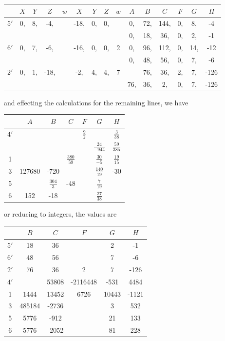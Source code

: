 \documentclass[11pt,a4paper]{article}
\begin{document}
\newpage
\setcounter{page}{326}

\begin{center}
\begin{tabular}{c|cccc|cccc|cccccc}
& $X$ & $Y$ & $Z$ & $w$ & $X$ & $Y$ & $Z$ & $w$ & $A$ & $B$ & $C$ & $F$ & $G$ & $H$\\\hline
$5'$ & 0, & 8, & -4, & & -18, & 0, & 0, & & 0, & 72, & 144, & 0, & 8, & -4\\
& & & & & & & & & 0, & 18, & 36, & 0, & 2, & -1\\
$6'$ & 0, & 7, & -6, & & -16, & 0, & 0, & 2 & 0, & 96, & 112, & 0, & 14, & -12\\
& & & & & & & & & 0, & 48, & 56, & 0, & 7, & -6\\
$2'$ & 0, & 1, & -18, & & -2, & 4, & 4, & 7 & & 76, & 36, & 2, & 7, & -126\\
& & & & & & & & & 76, & 36, & 2, & 0, & 7, & -126\\
\end{tabular}
\end{center}
and effecting the calculations for the remaining lines, we have
\begin{center}
\begin{tabular}{c|cccccc}
& $A$ & $B$ & $C$ & $F$ & $G$ & $H$\\\hline
$4'$ & & & & $\frac{9}{2}$ & & $\frac{3}{38}$\\
& & & & & $\frac{24}{-944}$ & $\frac{59}{385}$\\
1 & & & $\frac{380}{59}$ & & $\frac{30}{-5}$ & $\frac{19}{15}$\\
3 & 127680 & -720 & & & $\frac{140}{19}$ & -30\\
5 & & $\frac{304}{3}$ & -48 & & $\frac{7}{19}$ & \\
6 & 152 & -18 & & & $\frac{27}{38}$ & \\
\end{tabular}
\end{center}
or reducing to integers, the values are
\begin{center}
\begin{tabular}{c|ccccc}
& $B$ & $C$ & $F$ & $G$ & $H$\\\hline
$5'$ & 18 & 36 & & 2 & -1\\
$6'$ & 48 & 56 & & 7 & -6\\
$2'$ & 76 & 36 & 2 & 7 & -126\\
$4'$ & & 53808 & -2116448 & -531 & 4484 \\
1 & 1444 & 13452 & 6726 & 10443 & -1121\\
3 & 485184 & -2736 & & 3 & 532 \\
5 & 5776 & -912 & & 21 & 133\\
6 & 5776 & -2052 & & 81 & 228
\end{tabular}
\end{center}
\end{document}
